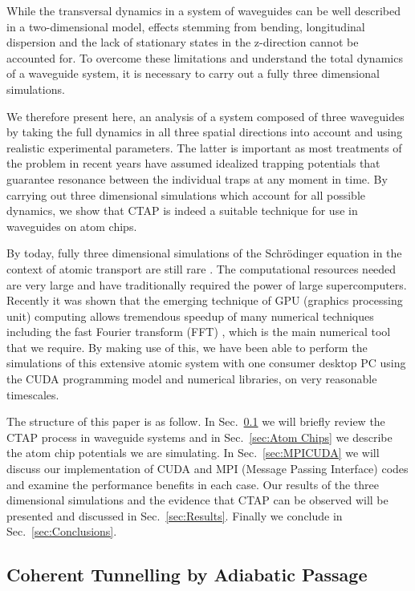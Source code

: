 While the transversal dynamics in a system of waveguides can be well described in a two-dimensional model, effects stemming from bending, longitudinal dispersion and the lack of stationary states in the z-direction cannot be accounted for. To overcome these limitations and understand the total dynamics of a waveguide system, it is necessary to carry out a fully three dimensional simulations.

We therefore present here, an analysis of a system composed of three waveguides by taking the full dynamics in all three spatial directions into account and using realistic experimental parameters. The latter is important as most treatments of the problem in recent years have assumed idealized trapping potentials that guarantee resonance between the individual traps at any moment in time. By carrying out three dimensional simulations which account for all possible dynamics, we show that CTAP is indeed a suitable technique for use in waveguides on atom chips.

By today, fully three dimensional simulations of the Schr\"odinger equation in the context of atomic transport are still rare \cite{Rab:08}. The computational resources needed are very large and have traditionally required the power of  large supercomputers. Recently it was shown that the emerging technique of GPU (graphics processing unit) computing allows tremendous speedup of many numerical techniques including the fast Fourier transform (FFT) \cite{Bauke:11}, which is the main numerical tool that we require. By making use of this, we have been able to perform the simulations of this extensive atomic system with one consumer desktop PC using the CUDA programming model and numerical libraries, on very reasonable timescales.

The structure of this paper is as follow. In Sec.~\ref{sec:CTAP} we will briefly review the CTAP process in waveguide systems and in Sec.~\ref{sec:Atom Chips} we describe the atom chip potentials we are simulating. In Sec.~\ref{sec:MPICUDA} we will discuss our
implementation of CUDA and MPI (Message Passing Interface) codes and examine the performance benefits in each case.  Our results of the three dimensional simulations and the evidence that CTAP can be observed will be presented and discussed in Sec.~\ref{sec:Results}. Finally we conclude in Sec.~\ref{sec:Conclusions}.

\subsection{Coherent Tunnelling by Adiabatic Passage}
\label{sec:CTAP}

